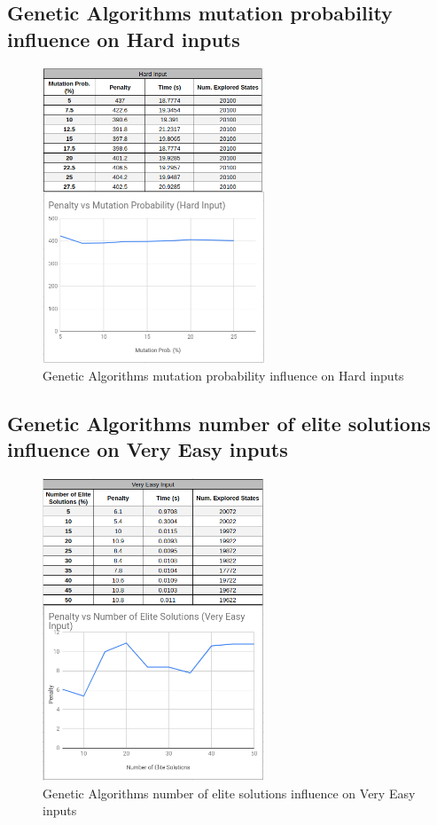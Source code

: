 \documentclass[conference]{IEEEtran}
\begin{document}
\subsection{Genetic Algorithms mutation probability influence on Hard inputs}

\begin{figure}[H]
    \centerline{\includegraphics[width=250px]{mutation_prob_hard.png}}
    \caption{Genetic Algorithms mutation probability influence on Hard inputs}
\end{figure}

\subsection{Genetic Algorithms number of elite solutions influence on Very Easy inputs}

\begin{figure}[H]
    \centerline{\includegraphics[width=250px]{elite_very_easy.png}}
    \caption{Genetic Algorithms number of elite solutions influence on Very Easy inputs}
\end{figure}
\end{document}
